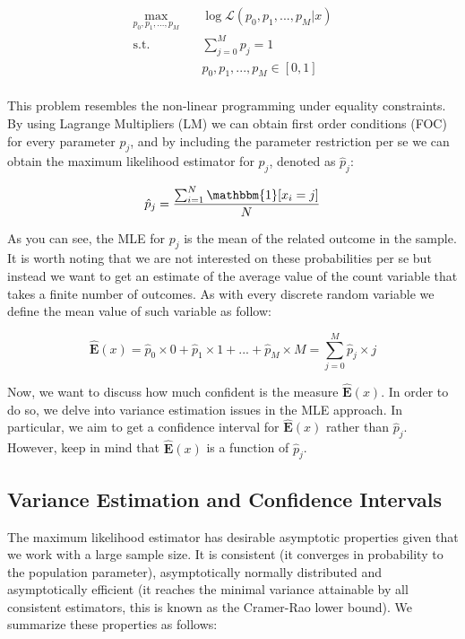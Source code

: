 \documentclass[12pt]{article}         %
\begin{document}
\begin{equation}
\begin{aligned}
\max_{p_0,p_1,...,p_M} \quad & \log\mathcal{L}(p_0,p_1,...,p_M\vert x) \\
\textrm{s.t.} \quad & \sum_{j=0}^M p_j = 1\\
  & p_0,p_1,...,p_M\in [0,1] \\
\end{aligned}
\end{equation}

This problem resembles the non-linear programming under equality constraints. By using Lagrange Multipliers (LM) we can obtain first order conditions (FOC) for every parameter $p_j$, and by including the parameter restriction per se we can obtain the maximum likelihood estimator for $p_j$, denoted as $\hat{p}_j$:

\begin{equation}
\hat{p}_j = \dfrac{\sum_{i=1}^N \mathbbm{1}[x_i=j]}{N}
\end{equation}

As you can see, the MLE for $p_j$ is the mean of the related outcome in the sample. It is worth noting that we are not interested on these probabilities per se but instead we want to get an estimate of the average value of the count variable that takes a finite number of outcomes. As with every discrete random variable we define the mean value of such variable as follow:

\begin{equation}
\mathbf{\hat{E}}(x) = \hat{p}_0\times 0 + \hat{p}_1\times 1 + ... + \hat{p}_M\times M = \sum_{j=0}^{M} \hat{p}_j\times j
\end{equation}

Now, we want to discuss how much confident is the measure $\mathbf{\hat{E}}(x)$. In order to do so, we delve into variance estimation issues in the MLE approach. In particular, we aim to get a confidence interval for $\mathbf{\hat{E}}(x)$ rather than $\hat{p}_j$. However, keep in mind that $\mathbf{\hat{E}}(x)$ is a function of $\hat{p}_j$.

\subsection{Variance Estimation and Confidence Intervals}
The maximum likelihood estimator has desirable asymptotic properties given that we work with a large sample size. It is consistent (it converges in probability to the population parameter), asymptotically normally distributed and asymptotically efficient (it reaches the minimal variance attainable by all consistent estimators, this is known as the Cramer-Rao lower bound). We summarize these properties as follows:
\end{document}
